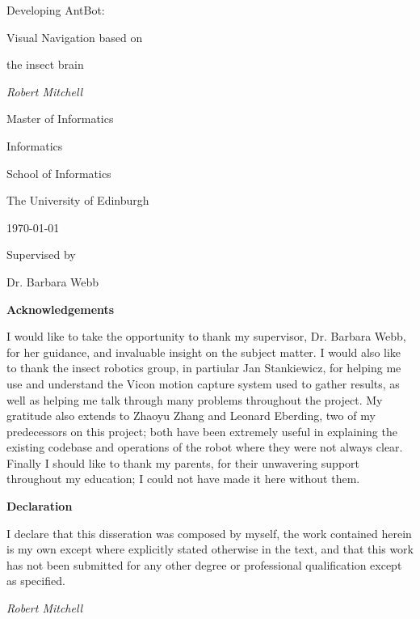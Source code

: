 \documentclass[a4paper,11pt,twoside,openright]{article}
\begin{document}
\centering
\vspace*{6cm}
{\huge Developing AntBot: \par Visual Navigation based on \par the insect brain \par}
\vspace{1cm}
{\Large \textit{Robert Mitchell}}

\vspace{3cm}

{\large Master of Informatics \par}
{\large Informatics \par}
{\large School of Informatics \par}
{\large The University of Edinburgh \par}
\large \today \par

\vfill
Supervised by\par
Dr. Barbara Webb

\newpage

\centering
{\LARGE \textbf{Acknowledgements}}
\begin{flushleft}
 {\small
  I would like to take the opportunity to thank my supervisor, Dr. Barbara Webb, for her
  guidance, and invaluable insight on the subject matter. I would also like to thank the
  insect robotics group, in partiular Jan Stankiewicz, for helping me use and understand the
  Vicon motion capture system used to gather results, as well as helping me talk through many
  problems throughout the project. My gratitude also extends to
  Zhaoyu Zhang and Leonard Eberding, two of my predecessors on this project; both have been
  extremely useful in explaining the existing codebase and operations of the robot where they
  were not always clear. Finally I should like to thank my parents, for their unwavering support
  throughout my education; I could not have made it here without them. }
\end{flushleft}  

\newpage
\centering
{\LARGE\textbf{Declaration}}
\begin{flushleft}
  {\small
    I declare that this disseration was composed by myself, the work
    contained herein is my own except where explicitly stated otherwise
    in the text, and that this work has not been submitted for any other
    degree or professional qualification except as specified.
    \par 

    \textit{Robert Mitchell}}

\end{flushleft}
\end{document}
